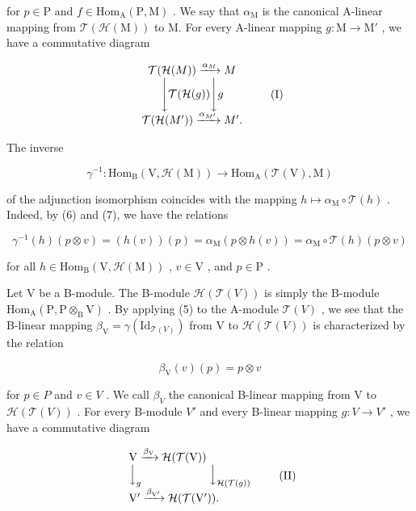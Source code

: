 for \(p \in \mathrm{P}\) and \(f \in \mathrm{Hom}_{\mathrm{A}}(\mathrm{P}, \mathrm{M})\) . We say that \(\alpha_{\mathrm{M}}\) is the canonical A-linear mapping from \(\mathcal{T}(\mathcal{H}(\mathrm{M}))\) to M. For every A-linear mapping \(g: \mathrm{M} \to \mathrm{M}'\) , we have a commutative diagram

\[
\begin{array}{c} \mathcal {T} (\mathcal {H} (M)) \xrightarrow {\alpha_ {M}} M \\ \Biggl \downarrow \mathcal {T} (\mathcal {H} (g)) \Biggl \downarrow g \\ \mathcal {T} (\mathcal {H} (M ^ {\prime})) \xrightarrow {\alpha_ {M ^ {\prime}}} M ^ {\prime}. \end{array}\tag{I}
\]

The inverse

\[
\gamma^ {- 1}: \mathrm{Hom} _ {\mathrm{B}} (\mathrm{V}, \mathcal {H} (\mathrm{M})) \longrightarrow \mathrm{Hom} _ {\mathrm{A}} (\mathcal {T} (\mathrm{V}), \mathrm{M})
\]

of the adjunction isomorphism coincides with the mapping \(h \mapsto \alpha_{\mathrm{M}} \circ \mathcal{T}(h)\) . Indeed, by (6) and (7), we have the relations

\[
\gamma^ {- 1} (h) (p \otimes v) = (h (v)) (p) = \alpha_ {\mathrm{M}} (p \otimes h (v)) = \alpha_ {\mathrm{M}} \circ \mathcal {T} (h) (p \otimes v)
\]

for all \(h\in \mathrm{Hom}_{\mathrm{B}}(\mathrm{V},\mathcal{H}(\mathrm{M}))\) , \(v\in \mathrm{V}\) , and \(p\in \mathrm{P}\) .

Let V be a B-module. The B-module \(\mathcal{H}(\mathcal{T}(V))\) is simply the B-module \(\mathrm{Hom}_{\mathrm{A}}(\mathrm{P},\mathrm{P}\otimes_{\mathrm{B}}\mathrm{V})\) . By applying (5) to the A-module \(\mathcal{T}(V)\) , we see that the B-linear mapping \(\beta_{\mathrm{V}}=\gamma(\mathrm{Id}_{\mathcal{T}(V)})\) from V to \(\mathcal{H}(\mathcal{T}(V))\) is characterized by the relation

\[
\beta_ {\mathrm{V}} (v) (p) = p \otimes v\tag{8}
\]

for \(p \in P\) and \(v \in V\) . We call \(\beta_{V}\) the canonical B-linear mapping from V to \(\mathcal{H}(\mathcal{T}(V))\) . For every B-module \(V'\) and every B-linear mapping \(g : V \to V'\) , we have a commutative diagram

\[
\begin{array}{l} \mathrm{V} \xrightarrow {\beta_ {\mathrm{V}}} \mathcal {H} (\mathcal {T} (\mathrm{V})) \\ \Big \downarrow_ {g} \qquad \qquad \qquad \Big \downarrow_ {\mathcal {H} (\mathcal {T} (g))} \\ \mathrm{V} ^ {\prime} \xrightarrow {\beta_ {\mathrm{V} ^ {\prime}}} \mathcal {H} (\mathcal {T} (\mathrm{V} ^ {\prime})). \end{array}\tag{II}
\]

